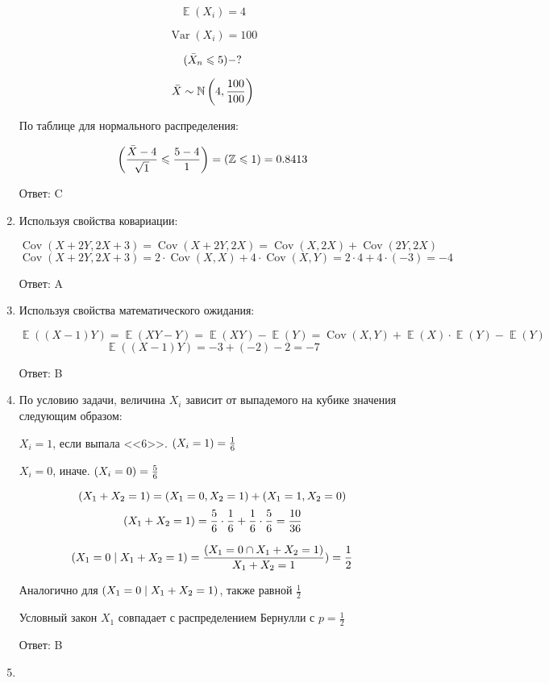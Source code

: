 \documentclass[a4paper]{article} %
\DeclareMathOperator{\Var}{Var}
\DeclareMathOperator{\Cov}{Cov}
\DeclareMathOperator{\E}{\mathbb{E}}
\let\P\relax
\DeclareMathOperator{\P}{\mathbb{P}}
\newcommand \N{\mathbb{N}}
\newcommand \Z{\mathbb{Z}}
\renewcommand{\leq}{\leqslant}
\begin{document}
\begin{enumerate}
    \[\E(X_i) = 4\]

    \[\Var(X_i) = 100\]

    \[\P(\Bar X_n \leq 5) - ?\]

    \[\Bar X \sim \N\left(4,\frac{100}{100}\right)\]
    
    По таблице для нормального распределения:

    \[\P\left(\frac{\Bar X - 4}{\sqrt{1}} \leq \frac{5-4}{1}\right) = \P(\Z\leq 1) = 0.8413\]
    
    Ответ: C

    \item
    
    Используя свойства ковариации:

    \[\Cov(X+2Y, 2X + 3) = \Cov(X+2Y, 2X) = \Cov(X, 2X) + \Cov(2Y, 2X) \]
    \[\Cov(X+2Y, 2X + 3) = 2 \cdot \Cov(X,X) + 4 \cdot \Cov(X,Y) = 2 \cdot 4 + 4 \cdot (-3) = -4\]

    Ответ: A

    \item
    
    Используя свойства математического ожидания:

    \[\E((X-1)Y) = \E(XY - Y) = \E(XY) - \E(Y) = \Cov(X,Y) + \E(X)\cdot\E(Y) -\E(Y)\] 
    \[\E((X-1)Y) = -3 + (-2) - 2 = -7\]

    Ответ: B

    \item
    
    По условию задачи, величина $X_{i}$ зависит от выпадемого на кубике значения следующим образом:

    $X_{i} = 1$, если выпала <<6>>. $\P(X_{i} = 1) = \frac{1}{6}$

    $X_{i} = 0$, иначе. $\P(X_{i} = 0) = \frac{5}{6}$

    \[\P(X_{1} + X_{2} = 1) = \P(X_{1} = 0, X_{2} = 1) + \P(X_{1} = 1, X_{2} = 0) \]
    \[\P(X_{1} + X_{2} = 1) = \frac{5}{6} \cdot \frac{1}{6} + \frac{1}{6} \cdot \frac{5}{6} = \frac{10}{36}\]
    
    \[\P(X_{1} = 0\mid X_{1} + X_{2} = 1) = \frac{\P(X_{1} = 0\cap X_{1} + X_{2} = 1)}{X_{1} + X_{2} = 1}) = \frac{1}{2}\]
    
    Аналогично для $\P(X_{1} = 0\mid X_{1} + X_{2} = 1)$, также равной $\frac{1}{2}$

    Условный закон $X_{1}$ совпадает с распределением Бернулли с $p = \frac{1}{2}$
    
    Ответ: B

    \item


\end{enumerate}
\end{document}
